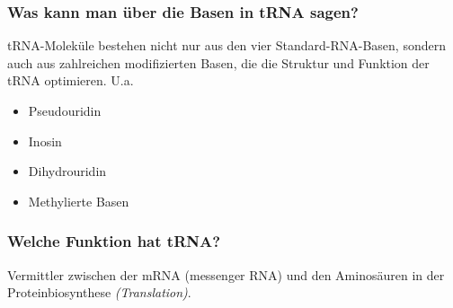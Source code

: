 \documentclass{article}
\begin{document}
\subsubsection*{Was kann man über die Basen in tRNA sagen?}
tRNA-Moleküle bestehen nicht nur aus den vier Standard-RNA-Basen, sondern auch aus zahlreichen modifizierten Basen, die die Struktur und Funktion der tRNA optimieren. U.a. 
\begin{itemize} 
    \item Pseudouridin
    \item Inosin
    \item Dihydrouridin
    \item Methylierte Basen
\end{itemize}

\subsubsection*{Welche Funktion hat tRNA?}
Vermittler zwischen der mRNA (messenger RNA) und den Aminosäuren in der Proteinbiosynthese \textit{(Translation)}. 
\end{document}
